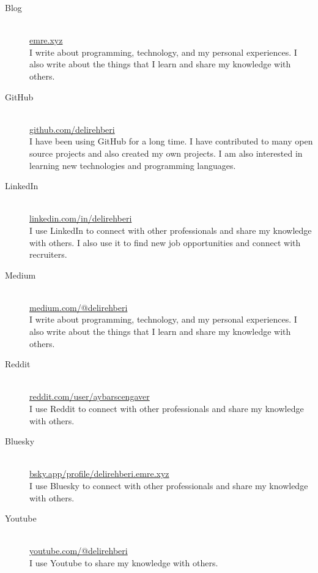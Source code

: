 
\newpage

\begin{cventries}
  \begin{description}
    \item[Blog] \hfill \\
      \href{https://emre.xyz}{emre.xyz} \hfill \\
      I write about programming, technology, and my personal experiences. I also write about the things that I learn and share my knowledge with others.
    \item[GitHub] \hfill \\
      \href{https://github.com/delirehberi}{github.com/delirehberi} \hfill \\
      I have been using GitHub for a long time. I have contributed to many open source projects and also created my own projects. I am also interested in learning new technologies and programming languages.
    \item[LinkedIn] \hfill \\
    \href{https://www.linkedin.com/in/delirehberi/}{linkedin.com/in/delirehberi} \hfill \\
    I use LinkedIn to connect with other professionals and share my knowledge with others. I also use it to find new job opportunities and connect with recruiters.
    \item[Medium] \hfill \\
    \href{https://medium.com/@delirehberi}{medium.com/@delirehberi} \hfill \\
    I write about programming, technology, and my personal experiences. I also write about the things that I learn and share my knowledge with others.
    \item[Reddit] \hfill \\
    \href{https://www.reddit.com/user/aybarscengaver}{reddit.com/user/aybarscengaver} \hfill \\
    I use Reddit to connect with other professionals and share my knowledge with others.
    \item[Bluesky] \hfill \\
    \href{https://bsky.app/profile/delirehberi.emre.xyz}{bsky.app/profile/delirehberi.emre.xyz} \hfill \\
    I use Bluesky to connect with other professionals and share my knowledge with others. 
    \item[Youtube] \hfill \\
    \href{https://www.youtube.com/@delirehberi}{youtube.com/@delirehberi} \hfill \\
    I use Youtube to share my knowledge with others. 

  \end{description}
\end{cventries}
